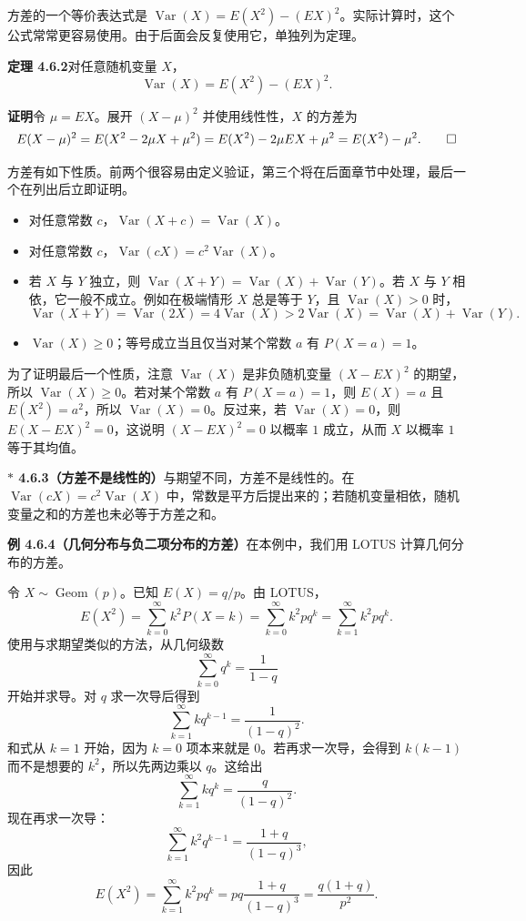 \documentclass[UTF8, 12pt, fontset=fandol, oneside]{ctexart}
\newcommand{\biohazard}{\ensuremath{\ast}}
\begin{document}
方差的一个等价表达式是 $\operatorname{Var}(X)=E(X^2)-(EX)^2$。实际计算时，这个公式常常更容易使用。由于后面会反复使用它，单独列为定理。

\noindent\textbf{定理 4.6.2}\quad 对任意随机变量 $X$，
\[
  \operatorname{Var}(X)=E(X^2)-(EX)^2.
\]

\noindent\textbf{证明}\quad 令 $\mu=EX$。展开 $(X-\mu)^2$ 并使用线性性，$X$ 的方差为
\[
  E(X-\mu)^2=E(X^2-2\mu X+\mu^2)
  =E(X^2)-2\mu EX+\mu^2
  =E(X^2)-\mu^2. \qed
\]

方差有如下性质。前两个很容易由定义验证，第三个将在后面章节中处理，最后一个在列出后立即证明。
\begin{itemize}
  \item 对任意常数 $c$，$\operatorname{Var}(X+c)=\operatorname{Var}(X)$。
  \item 对任意常数 $c$，$\operatorname{Var}(cX)=c^2\operatorname{Var}(X)$。
  \item 若 $X$ 与 $Y$ 独立，则 $\operatorname{Var}(X+Y)=\operatorname{Var}(X)+\operatorname{Var}(Y)$。若 $X$ 与 $Y$ 相依，它一般不成立。例如在极端情形 $X$ 总是等于 $Y$，且 $\operatorname{Var}(X)>0$ 时，
  \[
    \operatorname{Var}(X+Y)=\operatorname{Var}(2X)=4\operatorname{Var}(X)
    >2\operatorname{Var}(X)=\operatorname{Var}(X)+\operatorname{Var}(Y).
  \]
  \item $\operatorname{Var}(X)\ge 0$；等号成立当且仅当对某个常数 $a$ 有 $P(X=a)=1$。
\end{itemize}

为了证明最后一个性质，注意 $\operatorname{Var}(X)$ 是非负随机变量 $(X-EX)^2$ 的期望，所以 $\operatorname{Var}(X)\ge 0$。若对某个常数 $a$ 有 $P(X=a)=1$，则 $E(X)=a$ 且 $E(X^2)=a^2$，所以 $\operatorname{Var}(X)=0$。反过来，若 $\operatorname{Var}(X)=0$，则 $E(X-EX)^2=0$，这说明 $(X-EX)^2=0$ 以概率 $1$ 成立，从而 $X$ 以概率 $1$ 等于其均值。

\noindent\textbf{$\biohazard$ 4.6.3（方差不是线性的）}\quad 与期望不同，方差不是线性的。在 $\operatorname{Var}(cX)=c^2\operatorname{Var}(X)$ 中，常数是平方后提出来的；若随机变量相依，随机变量之和的方差也未必等于方差之和。

\noindent\textbf{例 4.6.4（几何分布与负二项分布的方差）}\quad 在本例中，我们用 LOTUS 计算几何分布的方差。

令 $X\sim\operatorname{Geom}(p)$。已知 $E(X)=q/p$。由 LOTUS，
\[
  E(X^2)=\sum_{k=0}^{\infty}k^2P(X=k)
  =\sum_{k=0}^{\infty}k^2pq^k
  =\sum_{k=1}^{\infty}k^2pq^k.
\]
使用与求期望类似的方法，从几何级数
\[
  \sum_{k=0}^{\infty}q^k=\frac{1}{1-q}
\]
开始并求导。对 $q$ 求一次导后得到
\[
  \sum_{k=1}^{\infty}kq^{k-1}=\frac{1}{(1-q)^2}.
\]
和式从 $k=1$ 开始，因为 $k=0$ 项本来就是 $0$。若再求一次导，会得到 $k(k-1)$ 而不是想要的 $k^2$，所以先两边乘以 $q$。这给出
\[
  \sum_{k=1}^{\infty}kq^k=\frac{q}{(1-q)^2}.
\]
现在再求一次导：
\[
  \sum_{k=1}^{\infty}k^2q^{k-1}=\frac{1+q}{(1-q)^3},
\]
因此
\[
  E(X^2)=\sum_{k=1}^{\infty}k^2pq^k
  =pq\frac{1+q}{(1-q)^3}
  =\frac{q(1+q)}{p^2}.
\]
\end{document}
